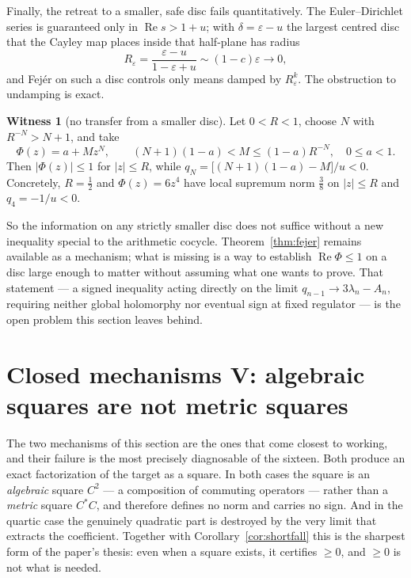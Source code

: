 \documentclass[11pt]{amsart}
\theoremstyle{definition}
\theoremstyle{remark}
\theoremstyle{definition}
\newtheorem{witness}{Witness}[section]
\renewcommand{\Re}{\operatorname{Re}}
\newcommand{\eps}{\varepsilon}
\begin{document}
\noindent Finally, the retreat to a smaller, safe disc fails quantitatively. The Euler--Dirichlet
series is guaranteed only in $\Re s>1+u$; with $\delta=\eps-u$ the largest centred disc that the
Cayley map places inside that half-plane has radius
\begin{equation}\label{eq:safe-radius}
   R_\eps=\frac{\eps-u}{1-\eps+u}\sim(1-c)\eps\longrightarrow0 ,
\end{equation}
and Fej\'er on such a disc controls only means damped by $R_\eps^k$. The obstruction to
undamping is exact.

\begin{witness}[no transfer from a smaller disc]\label{wit:fejer}
Let $0<R<1$, choose $N$ with $R^{-N}>N+1$, and take
\begin{equation}\label{eq:fejer-witness}
   \Phi(z)=a+Mz^N,\qquad (N+1)(1-a)<M\le(1-a)R^{-N},\quad 0\le a<1 .
\end{equation}
Then $|\Phi(z)|\le1$ for $|z|\le R$, while
$q_N=\bigl[(N+1)(1-a)-M\bigr]/u<0$. Concretely, $R=\tfrac12$ and $\Phi(z)=6z^4$ have local
supremum norm $\tfrac38$ on $|z|\le R$ and $q_4=-1/u<0$.
\end{witness}

\noindent So the information on any strictly smaller disc does not suffice without a new
inequality special to the arithmetic cocycle. Theorem~\ref{thm:fejer} remains available as a
mechanism; what is missing is a way to establish $\Re\Phi\le1$ on a disc large enough to matter
without assuming what one wants to prove. That statement --- a signed inequality acting directly
on the limit $q_{n-1}\to3\lambda_n-A_n$, requiring neither global holomorphy nor eventual sign at
fixed regulator --- is the open problem this section leaves behind.

\section{Closed mechanisms V: algebraic squares are not metric squares}\label{sec:mech-squares}

The two mechanisms of this section are the ones that come closest to working, and their failure is
the most precisely diagnosable of the sixteen. Both produce an exact factorization of the
target as a square. In both cases the square is an \emph{algebraic} square $C^2$ --- a composition
of commuting operators --- rather than a \emph{metric} square $C^{*}C$, and therefore defines no
norm and carries no sign. And in the quartic case the genuinely quadratic part is destroyed by the
very limit that extracts the coefficient. Together with
Corollary~\ref{cor:shortfall} this is the sharpest form of the paper's thesis: even when a square
exists, it certifies $\ge0$, and $\ge0$ is not what is needed.
\end{document}
